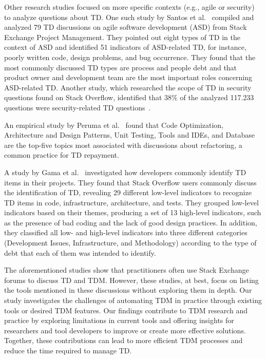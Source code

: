 Other research studies focused on more specific contexts (e.g., agile or security) to analyze  questions about TD. One such study by Santos et al.~\cite{Santos2022} compiled and analyzed 79 TD discussions on agile software development (ASD) from Stack Exchange Project Management. They pointed out eight types of TD in the context of ASD and identified 51 indicators of ASD-related TD, for instance, poorly written code, design problems, and bug occurrence. They found that the most commonly discussed TD types are process and people debt and that product owner and development team are the most important roles concerning ASD-related TD. Another study, which researched the scope of TD in security questions found on Stack Overflow, identified that 38\% of the analyzed 117.233 questions were security-related TD questions~\cite{Edbert2023}.

An empirical study by Peruma et al.~\cite{Peruma2021} found that Code Optimization, Architecture and Design Patterns, Unit Testing, Tools and IDEs, and Database are the top-five topics most associated with discussions about refactoring, a common practice for TD repayment.

A study by Gama et al.~\cite{Gama2020} investigated how developers commonly identify TD items in their projects. They found that Stack Overflow users commonly discuss the identification of TD, revealing 29 different low-level indicators to recognize TD items in code, infrastructure, architecture, and tests. They grouped low-level indicators based on their themes, producing a set of 13 high-level indicators, such as the presence of bad coding and the lack of good design practices. In addition, they classified all low- and high-level indicators into three different categories (Development Issues, Infrastructure, and Methodology) according to the type of debt that each of them was intended to identify.

The aforementioned studies show that practitioners often use Stack Exchange forums to discuss TD and TDM. However, these studies, at best, focus on listing the tools mentioned in these discussions without exploring them in depth.
Our study investigates the challenges of automating TDM in practice through existing tools or desired TDM features. Our findings contribute to TDM research and practice by exploring limitations in current tools and offering insights for researchers and tool developers to improve or create more effective solutions. Together, these contributions can lead to more efficient TDM processes and reduce the time required to manage TD.